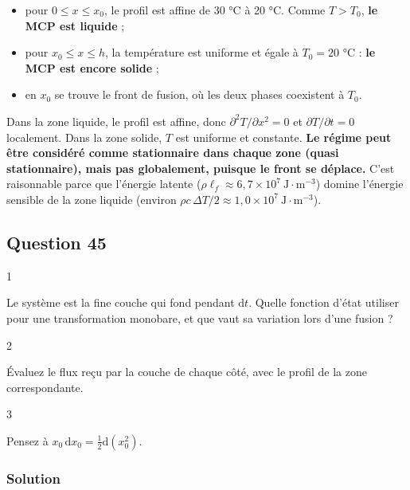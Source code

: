 \documentclass[11pt,a4paper]{article}
\providecommand{\tightlist}{\setlength{\itemsep}{0pt}\setlength{\parskip}{0pt}}
\renewcommand{\leq}{\leqslant}
\begin{document}
\begin{itemize}
\tightlist
\item
  pour \(0\leq x\leq x_0\), le profil est affine de 30 °C à 20 °C. Comme \(T>T_0\), \textbf{le MCP est liquide} ;
\item
  pour \(x_0\leq x\leq h\), la température est uniforme et égale à \(T_0 = 20\) °C : \textbf{le MCP est encore solide} ;
\item
  en \(x_0\) se trouve le front de fusion, où les deux phases coexistent à \(T_0\).
\end{itemize}

Dans la zone liquide, le profil est affine, donc \(\partial^2T/\partial x^2 = 0\) et \(\partial T/\partial t = 0\) localement. Dans la zone solide, \(T\) est uniforme et constante. \textbf{Le régime peut être considéré comme stationnaire dans chaque zone (quasi stationnaire), mais pas globalement, puisque le front se déplace.} C'est raisonnable parce que l'énergie latente (\(\rho\ell_f\approx6{,}7\times10^{7}\ \mathrm{J\cdot m^{-3}}\)) domine l'énergie sensible de la zone liquide (environ \(\rho c\,\Delta T/2\approx1{,}0\times10^{7}\ \mathrm{J\cdot m^{-3}}\)).

\hypertarget{question-45}{%
\subsection{Question 45}\label{question-45}}

\begin{indication}{1}

Le système est la fine couche qui fond pendant \(\mathrm{d}t\). Quelle fonction d'état utiliser pour une transformation monobare, et que vaut sa variation lors d'une fusion ?

\end{indication}

\begin{indication}{2}

Évaluez le flux reçu par la couche de chaque côté, avec le profil de la zone correspondante.

\end{indication}

\begin{indication}{3}

Pensez à \(x_0\,\mathrm{d}x_0 = \tfrac12\mathrm{d}(x_0^2)\).

\end{indication}

\hypertarget{solution-44}{%
\subsubsection{Solution}\label{solution-44}}
\end{document}
